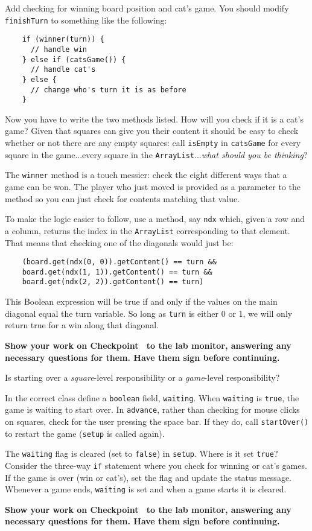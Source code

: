 \documentclass[12pt,oneside]{memoir}
\newcommand\code[1]{\lstinline^#1^}
\newenvironment{Checkpoint}[1]{%
  \begin{Exercise}[name={Checkpoint},title={#1}]}{%
  \end{Exercise}%
  \textbf{Show your work on Checkpoint~\theExercise{} to the lab monitor, %
    answering any necessary questions for them.  Have them sign before continuing.}}
\begin{document}
\begin{Checkpoint}{Winning and losing}
  Add checking for winning board position and cat's
  game. You should modify \code{finishTurn} to something like the
  following:

  \begin{lstlisting}
    if (winner(turn)) {
      // handle win
    } else if (catsGame()) {
      // handle cat's 
    } else {
      // change who's turn it is as before
    }
  \end{lstlisting}

  Now you have to write the two methods listed. How will you check if it
  is a cat's game? Given that squares can give you their content it
  should be easy to check whether or not there are any empty squares:
  call \code{isEmpty} in \code{catsGame} for every square in the
  game...every square in the \code{ArrayList}...\emph{what should you be
  thinking}? 

  The \code{winner} method is a touch messier: check the eight different
  ways that a game can be won. The player who just moved is provided as
  a parameter to the method so you can just check for contents matching
  that value.

  To make the logic easier to follow, use a method, say \code{ndx}
  which, given a row and a column, returns the index in the
  \code{ArrayList} corresponding to that element. That means that
  checking one of the diagonals would just be:

  \begin{lstlisting}
    (board.get(ndx(0, 0)).getContent() == turn &&
    board.get(ndx(1, 1)).getContent() == turn &&
    board.get(ndx(2, 2)).getContent() == turn)
  \end{lstlisting}

  This Boolean expression will be true if and only if the values on the
  main diagonal equal the turn variable. So long as \code{turn} is
  either 0 or 1, we will only return true for a win along that diagonal.
\end{Checkpoint}

\begin{Checkpoint}{New game}
  Is starting over a \emph{square}-level responsibility or a
  \emph{game}-level responsibility? 

  In the correct class define a \code{boolean} field,
  \code{waiting}. When \code{waiting} is \code{true}, the game is
  waiting to start over. In \code{advance}, rather than checking for
  mouse clicks on squares, check for the user pressing the space
  bar. If they do, call \code{startOver()} to restart the game
  (\code{setup} is called again).

  The \code{waiting} flag is cleared (set to \code{false}) in
  \code{setup}. Where is it set \code{true}? Consider the three-way
  \code{if} statement where you check for winning or cat's games. If
  the game is over (win or cat's), set the flag and update the status
  message. Whenever a game ends, \code{waiting} is set and when a game
  starts it is cleared.
\end{Checkpoint}
\end{document}
